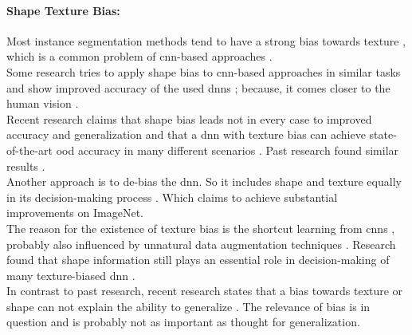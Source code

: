 		\paragraph{Shape Texture Bias:} Most instance segmentation methods tend to have a strong bias towards texture \cite{Theodoridis2022}, which is a common problem of \ac{cnn}-based approaches \cite{Geirhos2022}\cite{Baker2018}\cite{Tabak2023}.\\
		Some research tries to apply shape bias to \ac{cnn}-based approaches in similar tasks and show improved accuracy of the used \ac{dnn}s \cite{Geirhos2022}\cite{Hermann2020}; because, it comes closer to the human vision \cite{Geirhos2020}\cite{Mohla2022}\cite{Baker2020}.\\
		Recent research claims that shape bias leads not in every case to improved accuracy and generalization and that a \ac{dnn} with texture bias can achieve state-of-the-art \ac{ood} accuracy in many different scenarios \cite{Qiu2024}. Past research found similar results \cite{Brochu2019}.\\
		Another approach is to de-bias the \ac{dnn}. So it includes shape and texture equally in its decision-making process \cite{Li2021}\cite{Co2021}\cite{Chung2023}. Which claims to achieve substantial improvements on ImageNet. \\
		The reason for the existence of texture bias is the shortcut learning from \ac{cnn}s \cite{Geirhos2020}, probably also influenced by unnatural data augmentation techniques \cite{Hermann2020}. Research found that shape information still plays an essential role in decision-making of many texture-biased \ac{dnn} \cite{Tabak2023}.\\
		In contrast to past research, recent research states that a bias towards texture or shape can not explain the ability to generalize \cite{Gavrikov2024}. The relevance of bias is in question and is probably not as important as thought for generalization. %
